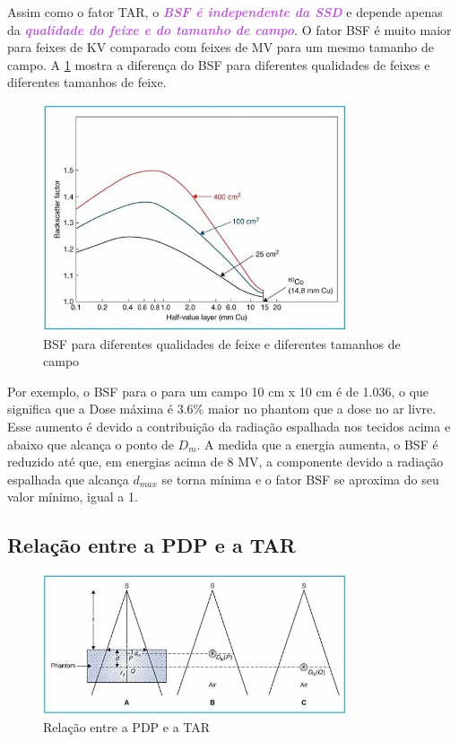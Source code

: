 \documentclass[11pt,a4paper]{article}
\newcounter{exemplo}
\begin{document}
	Assim como o fator TAR, o \textcolor{MediumOrchid}{\textbf{\textit{BSF é independente da SSD}}} e depende apenas da \textcolor{MediumOrchid}{\textbf{\textit{qualidade do feixe e do tamanho de campo}}}. O fator BSF é muito maior para feixes de KV comparado com feixes de MV para um mesmo tamanho de campo. A \ref{fig:bsf} mostra a diferença do BSF para diferentes qualidades de feixes e diferentes tamanhos de feixe. 

	\begin{figure}[h]
		\centering
		\includegraphics[width=0.8\textwidth]{Imagens/bsf.JPG}
		\caption{BSF para diferentes qualidades de feixe e diferentes tamanhos de campo}
		\label{fig:bsf}                
	\end{figure}

	Por exemplo, o BSF para o  para um campo 10 cm x 10 cm é de 1.036, o que significa que a Dose máxima é 3.6\% maior no phantom que a dose no ar livre. Esse aumento é devido a contribuição da radiação espalhada nos tecidos acima e abaixo que alcança o ponto de $D_{m}$. A medida que a energia aumenta, o BSF é reduzido até que, em energias acima de 8 MV, a componente devido a radiação espalhada que alcança $d_{max}$ se torna mínima e o fator BSF se aproxima do seu valor mínimo, igual a 1. 


	\subsection*{Relação entre a PDP e a TAR}

	\begin{figure}[h]
		\centering
		\includegraphics[width=0.8\textwidth]{Imagens/pdpETar.JPG}
		\caption{Relação entre a PDP e a TAR}
		\label{fig:pdpETar}                
	\end{figure}
\end{document}
